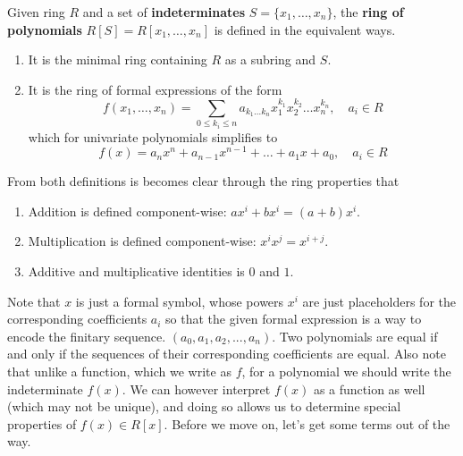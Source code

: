   \begin{definition}
    Given ring $R$ and a set of \textbf{indeterminates} $S = \{x_1, \ldots, x_n\}$, the \textbf{ring of polynomials} $R[S] = R[x_1, \ldots, x_n]$ is defined in the equivalent ways. 
    \begin{enumerate}
      \item It is the minimal ring containing $R$ as a subring and $S$. 
      \item It is the ring of formal expressions of the form 
      \begin{equation}
        f(x_1, \ldots, x_n) = \sum_{0 \leq k_i \leq n} a_{k_1 \ldots k_n} x_1^{k_1} x_2^{k_2} \ldots x_n^{k_n}, \quad a_i \in R
      \end{equation}
      which for univariate polynomials simplifies to 
      \begin{equation}
        f(x) = a_nx^n + a_{n-1}x^{n-1} + \dots + a_1 x + a_0, \quad a_i \in R
      \end{equation}
    \end{enumerate}
    From both definitions is becomes clear through the ring properties that 
    \begin{enumerate}
      \item Addition is defined component-wise: $a x^i + b x^i = (a + b) x^i$. 
      \item Multiplication is defined component-wise: $x^i x^j = x^{i + j}$. 
      \item Additive and multiplicative identities is $0$ and $1$. 
    \end{enumerate}
  \end{definition}

  Note that $x$ is just a formal symbol, whose powers $x^i$ are just placeholders for the corresponding coefficients $a_i$ so that the given formal expression is a way to encode the finitary sequence. $(a_0, a_1, a_2, ..., a_n)$. Two polynomials are equal if and only if the sequences of their corresponding coefficients are equal. Also note that unlike a function, which we write as $f$, for a polynomial we should write the indeterminate $f(x)$. We can however interpret $f(x)$ as a function as well (which may not be unique), and doing so allows us to determine special properties of $f(x) \in R[x]$. Before we move on, let's get some terms out of the way. 

